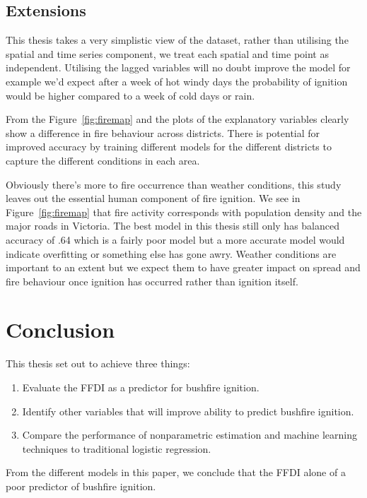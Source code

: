 \documentclass[11pt,a4paper]{article}
\begin{document}
\subsection{Extensions}

This thesis takes a very simplistic view of the dataset, rather than utilising the spatial and time series component, we treat each spatial and time point as independent. Utilising the lagged variables will no doubt improve the model for example we'd expect after a week of hot windy days the probability of ignition would be higher compared to a week of cold days or rain.

From the Figure~\ref{fig:firemap} and the plots of the explanatory variables clearly show a difference in fire behaviour across districts. There is potential for improved accuracy by training different models for the different districts to capture the different conditions in each area.

Obviously there's more to fire occurrence than weather conditions, this study leaves out the essential human component of fire ignition. We see in Figure~\ref{fig:firemap} that fire activity corresponds with population density and the major roads in Victoria. The best model in this thesis still only has balanced accuracy of .64 which is a fairly poor model but a more accurate model would indicate overfitting or something else has gone awry.  Weather conditions are important to an extent but we expect them to have greater impact on spread and fire behaviour once ignition has occurred rather than ignition itself.


\section{Conclusion}

This thesis set out to achieve three things:
\begin{enumerate}
  \item Evaluate the FFDI as a predictor for bushfire ignition.
  \item Identify other variables that will improve ability to predict bushfire ignition.
  \item Compare the performance of nonparametric estimation and machine learning techniques to traditional logistic regression.
\end{enumerate}

From the different models in this paper, we conclude that the FFDI alone of a poor predictor of bushfire ignition.
\end{document}
